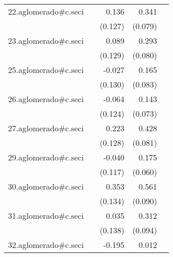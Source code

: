 {\begin{longtable}{l*{4}{D{.}{.}{-1}}}
\addlinespace
22.aglomerado#c.seci&                     &       0.136         &       0.341\sym{***}&                     \\
            &                     &     (0.127)         &     (0.079)         &                     \\
\addlinespace
23.aglomerado#c.seci&                     &       0.089         &       0.293\sym{***}&                     \\
            &                     &     (0.129)         &     (0.080)         &                     \\
\addlinespace
25.aglomerado#c.seci&                     &      -0.027         &       0.165\sym{*}  &                     \\
            &                     &     (0.130)         &     (0.083)         &                     \\
\addlinespace
26.aglomerado#c.seci&                     &      -0.064         &       0.143         &                     \\
            &                     &     (0.124)         &     (0.073)         &                     \\
\addlinespace
27.aglomerado#c.seci&                     &       0.223         &       0.428\sym{***}&                     \\
            &                     &     (0.128)         &     (0.081)         &                     \\
\addlinespace
29.aglomerado#c.seci&                     &      -0.040         &       0.175\sym{**} &                     \\
            &                     &     (0.117)         &     (0.060)         &                     \\
\addlinespace
30.aglomerado#c.seci&                     &       0.353\sym{**} &       0.561\sym{***}&                     \\
            &                     &     (0.134)         &     (0.090)         &                     \\
\addlinespace
31.aglomerado#c.seci&                     &       0.035         &       0.312\sym{***}&                     \\
            &                     &     (0.138)         &     (0.094)         &                     \\
\addlinespace
32.aglomerado#c.seci&                     &      -0.195         &       0.012         &                     \\

\end{longtable}}
